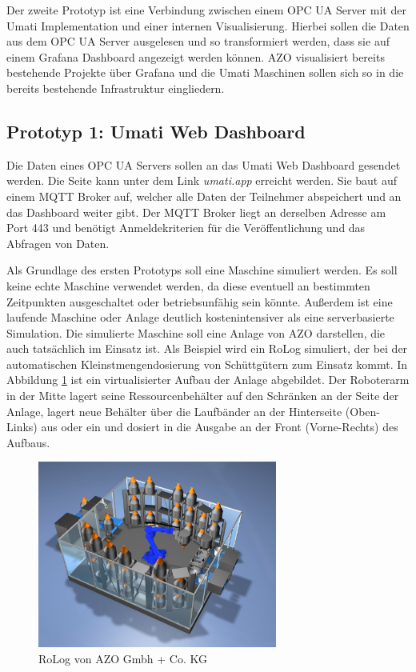 \documentclass[a4paper, 12pt, oneside, toc=listofnumbered, bibliography=totoc]{scrbook}
\begin{document}
		Der zweite Prototyp ist eine Verbindung zwischen einem OPC UA Server mit der Umati Implementation und einer internen Visualisierung. Hierbei sollen die Daten aus dem OPC UA Server ausgelesen und so transformiert werden, dass sie auf einem Grafana Dashboard angezeigt werden können. AZO visualisiert bereits bestehende Projekte über Grafana und die Umati Maschinen sollen sich so in die bereits bestehende Infrastruktur eingliedern.
		
		\subsection{Prototyp 1: Umati Web Dashboard}\label{Prototyp:1}
		
		Die Daten eines OPC UA Servers sollen an das Umati Web Dashboard gesendet werden. Die Seite kann unter dem Link \textit{umati.app} erreicht werden. Sie baut auf einem MQTT Broker auf, welcher alle Daten der Teilnehmer abspeichert und an das Dashboard weiter gibt. Der MQTT Broker liegt an derselben Adresse am Port 443 und benötigt Anmeldekriterien für die Veröffentlichung und das Abfragen von Daten.
		
		Als Grundlage des ersten Prototyps soll eine Maschine simuliert werden. Es soll keine echte Maschine verwendet werden, da diese eventuell an bestimmten Zeitpunkten ausgeschaltet oder betriebsunfähig sein könnte. Außerdem ist eine laufende Maschine oder Anlage deutlich kostenintensiver als eine serverbasierte Simulation. Die simulierte Maschine soll eine Anlage von AZO darstellen, die auch tatsächlich im Einsatz ist. Als Beispiel wird ein RoLog simuliert, der bei der automatischen Kleinstmengendosierung von Schüttgütern zum Einsatz kommt. In Abbildung \ref{fig:RoLog} ist ein virtualisierter Aufbau der Anlage abgebildet. Der Roboterarm in der Mitte lagert seine Ressourcenbehälter auf den Schränken an der Seite der Anlage, lagert neue Behälter über die Laufbänder an der Hinterseite (Oben-Links) aus oder ein und dosiert in die Ausgabe an der Front (Vorne-Rechts) des Aufbaus. \cite{noauthor_azo_nodate}
		
		\begin{figure}[H]
			\centering
			\includegraphics[width=0.7\textwidth]{res/RoLog.png}
			\caption{RoLog von AZO Gmbh + Co. KG \cite{noauthor_azo_nodate}}
			\label{fig:RoLog}
		\end{figure}
	
\end{document}

